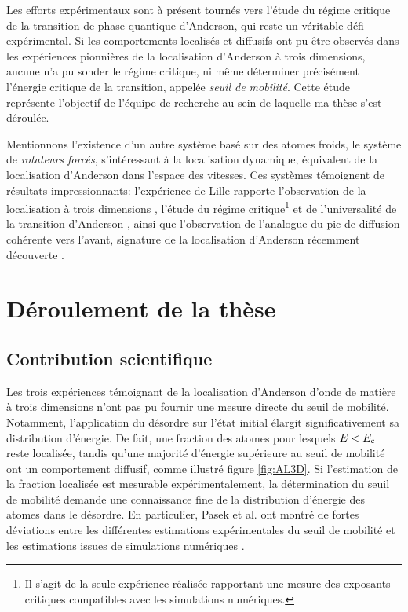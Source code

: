 Les efforts expérimentaux sont à présent tournés vers l'étude du régime critique de la transition de phase quantique d'Anderson, qui reste un véritable défi expérimental. Si les comportements localisés et diffusifs ont pu être observés dans les expériences pionnières de la localisation d'Anderson à trois dimensions, aucune n'a pu sonder le régime critique, ni même déterminer précisément l'énergie critique de la transition, appelée \emph{seuil de mobilité}. Cette étude représente l'objectif de l'équipe de recherche au sein de laquelle ma thèse s'est déroulée.

Mentionnons l'existence d'un autre système basé sur des atomes froids, le système de \emph{rotateurs forcés}, s'intéressant à la localisation dynamique, équivalent de la localisation d'Anderson dans l'espace des vitesses. Ces systèmes témoignent de résultats impressionnants: l'expérience de Lille rapporte l'observation de la localisation à trois dimensions \citep{chabe2008experimental}, l'étude du régime critique\footnote{Il s'agit de la seule expérience réalisée rapportant une mesure des exposants critiques compatibles avec les simulations numériques.} et de l'universalité de la transition d'Anderson \citep{lopez2012experimental}, ainsi que l'observation de l'analogue du pic de diffusion cohérente vers l'avant, signature de la localisation d'Anderson récemment découverte \citep{hainaut2018controlling}.


\section{Déroulement de la thèse}

\subsection{Contribution scientifique}
Les trois expériences témoignant de la localisation d'Anderson d'onde de matière à trois dimensions n'ont pas pu fournir une mesure directe du seuil de mobilité. Notamment, l'application du désordre sur l'état initial élargit significativement sa distribution d'énergie. De fait, une fraction des atomes pour lesquels $E<E_{\mathrm{c}}$ reste localisée, tandis qu'une majorité d'énergie supérieure au seuil de mobilité ont un comportement diffusif, comme illustré figure \ref{fig:AL3D}. Si l'estimation de la fraction localisée est mesurable expérimentalement, la détermination du seuil de mobilité demande une connaissance fine de la distribution d'énergie des atomes dans le désordre. En particulier, Pasek et al. ont montré de fortes déviations entre les différentes estimations expérimentales du seuil de mobilité et les estimations issues de simulations numériques \citep{pasek2017anderson}.

